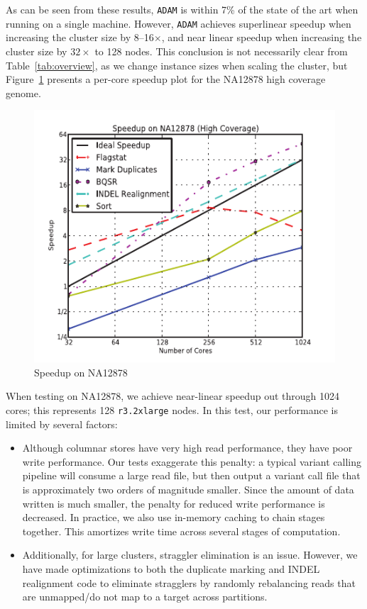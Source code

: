 \documentclass{acm_proc_article-sp}
\begin{document}
As can be seen from these results, \texttt{ADAM} is within 7\% of the state of the art when running on a single machine.
However, \texttt{ADAM} achieves superlinear speedup when increasing the cluster size by 8--16$\times$, and near
linear speedup when increasing the cluster size by $32\times$ to 128 nodes. This conclusion is not necessarily clear
from Table~\ref{tab:overview}, as we change instance sizes when scaling the cluster, but Figure~\ref{fig:speedup}
presents a per-core speedup plot for the NA12878 high coverage genome.

\begin{figure}[h]
\begin{center}
\includegraphics{graphs/speedup_na12878.pdf}
\end{center}
\caption{Speedup on NA12878}
\label{fig:speedup}
\end{figure}

When testing on NA12878, we achieve near-linear speedup out through 1024 cores; this represents 128
\texttt{r3.2xlarge} \linebreak nodes. In this test, our performance is limited by several factors:

\begin{itemize}
\item Although columnar stores have very high read performance, they have poor write performance. Our
tests exaggerate this penalty: a typical variant calling pipeline will consume a large read file, but then output a
variant call file that is approximately two orders of magnitude smaller. Since the amount of data written is much smaller,
the penalty for reduced write performance is decreased. In practice, we also use in-memory caching to chain stages
together. This amortizes write time across several stages of computation.
\item Additionally, for large clusters, straggler elimination is an issue. However, we have made optimizations to
both the duplicate marking and INDEL realignment code to eliminate stragglers by randomly
rebalancing reads that are unmapped/do not map to a target across partitions.
\end{itemize}
\end{document}
